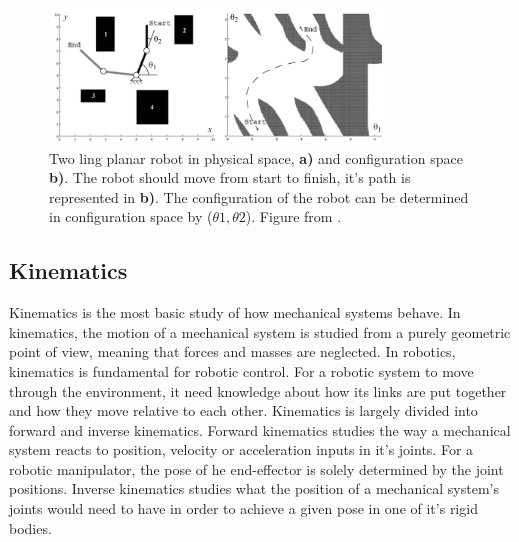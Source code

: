 \begin{figure}[htp]
  \centering
  \includegraphics[width = 0.8\textwidth]{Figures/figConfSpace.pdf}
  \caption{Two ling planar robot in physical space, \textbf{a)} and configuration space \textbf{b)}. The robot should move from start to finish, it's path is represented in \textbf{b)}. The configuration of the robot can be determined in configuration space by ($\theta1, \theta2$). Figure from \cite{SiegwartRoland2011Itam}.}
  \label{fig:T:RC:CSpace}
\end{figure}

\subsection{Kinematics}
Kinematics is the most basic study of how mechanical systems behave\cite{SiegwartRoland2011Itam}. In kinematics, the motion of a mechanical system is studied from a purely geometric point of view, meaning that forces and masses are neglected. In robotics, kinematics is fundamental for robotic control. For a robotic system to move through the environment, it need knowledge about how  its links are put together and how they move relative to each other. Kinematics is largely divided into forward and inverse kinematics. Forward kinematics studies the way a mechanical system reacts to position, velocity or acceleration inputs in it's joints. For a robotic manipulator, the pose of he end-effector is solely determined by the joint positions. Inverse kinematics studies what the position of a mechanical system's joints would need to have in order to achieve a given pose in one of it's rigid bodies.

